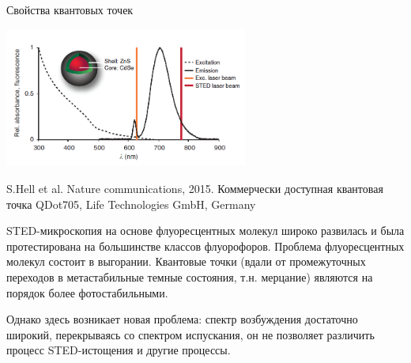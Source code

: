 \documentclass[9pt, compress, xcolor=table]{beamer}
\begin{document}

\begin{frame}{Свойства квантовых точек}
\begin{center}
\includegraphics[width=0.6\textwidth]{ffm22}
\end{center}

S.Hell et al. Nature communications, 2015. Коммерчески доступная квантовая точка QDot705, Life Technologies GmbH, Germany

{\small STED-микроскопия на основе флуоресцентных молекул широко развилась и была протестирована на большинстве классов флуорофоров. Проблема флуоресцентных молекул состоит в выгорании. Квантовые точки (вдали от промежуточных переходов в метастабильные темные состояния, т.н. мерцание) являются на порядок более фотостабильными.

Однако здесь возникает новая проблема: спектр возбуждения достаточно широкий, перекрываясь со спектром испускания, он не позволяет различить процесс STED-истощения и другие процессы.}
\end{frame}
\end{document}
